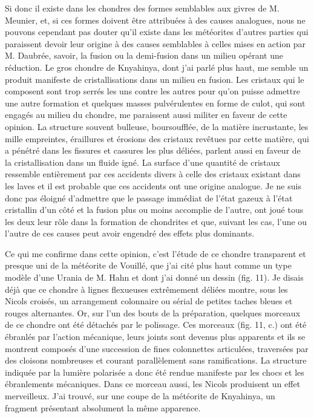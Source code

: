 \documentclass[a4paper, 12pt, oneside, french]{book}
\begin{document}
Si donc il existe dans les chondres des formes semblables aux givres de M. Meunier, et, si ces formes doivent être attribuées à des causes analogues, nous ne pouvons cependant pas douter qu'il existe dans les météorites d'autres parties qui paraissent devoir leur origine à des causes semblables à celles mises en action par M. Daubrée, savoir, la fusion ou la demi-fusion dans un milieu opérant une réduction. Le gros chondre de Knyahinya, dont j'ai parlé plus haut, me semble un produit manifeste de cristallisations dans un milieu en fusion. Les cristaux qui le composent sont trop serrés les uns contre les autres pour qu'on puisse admettre une autre formation et quelques masses pulvérulentes en forme de culot, qui sont engagés au milieu du chondre, me paraissent aussi militer en faveur de cette opinion. La structure souvent bulleuse, boursoufflée, de la matière incrustante, les mille empreintes, éraillures et érosions des cristaux revêtues par cette matière, qui a pénétré dans les fissures et cassures les plus déliées, parlent aussi en faveur de la cristallisation dans un fluide igné. La surface d'une quantité de cristaux ressemble entièrement par ces accidents divers à celle des cristaux existant dans les laves et il est probable que ces accidents ont une origine analogue. Je ne suis donc pas éloigné d'admettre que le passage immédiat de l'état gazeux à l'état cristallin d'un côté et la fusion plus ou moins accomplie de l'autre, ont joué tous les deux leur rôle dans la formation de chondrites et que, suivant les cas, l'une ou l'autre de ces causes peut avoir engendré des effets plus dominants.

Ce qui me confirme dans cette opinion, c'est l'étude de ce chondre transparent et presque uni de la météorite de Vouillé, que j'ai cité plus haut comme un type modèle d'une Urania de M. Hahn et dont j'ai donné un dessin (fig. 11). Je disais déjà que ce chondre à lignes flexueuses extrêmement déliées montre, sous les Nicols croisés, un arrangement colonnaire ou sérial de petites taches bleues et rouges alternantes. Or, sur l'un des bouts de la préparation, quelques morceaux de ce chondre ont été détachés par le polissage. Ces morceaux (fig. 11, c.) ont été ébranlés par l'action mécanique, leurs joints sont devenus plus apparents et ils se montrent composés d'une succession de fines colonnettes articulées, traversées par des cloisons nombreuses et courant parallèlement sans ramifications. La structure indiquée par la lumière polarisée a donc été rendue manifeste par les chocs et les ébranlements mécaniques. Dans ce morceau aussi, les Nicols produisent un effet merveilleux. J'ai trouvé, sur une coupe de la météorite de Knyahinya, un fragment présentant absolument la même apparence.
\end{document}
